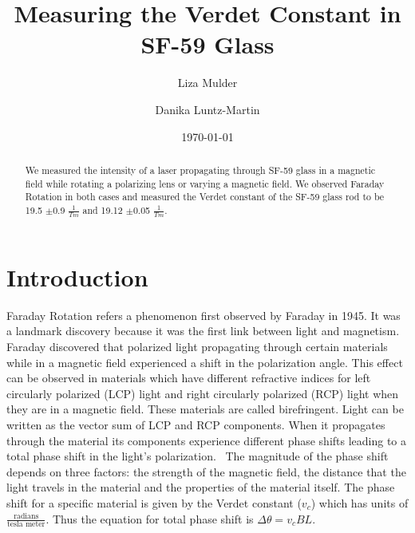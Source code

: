 \documentclass[prb,preprint]{revtex4-1}
\begin{document}

\title{Measuring the Verdet Constant in SF-59 Glass}


\author{Liza Mulder}


\author{Danika Luntz-Martin}


\date{\today}



\begin{abstract}

We measured the intensity of a laser propagating through SF-59 glass in a magnetic field while rotating a polarizing lens or varying a magnetic field.  We observed Faraday Rotation in both cases and measured the Verdet constant of the SF-59 glass rod to be 19.5 $\pm$0.9 $\frac{1}{Tm}$ and 19.12 $\pm$0.05 $\frac{1}{Tm}$.

\end{abstract}

\maketitle %


\section{Introduction} %

Faraday Rotation refers a phenomenon first observed by Faraday in 1945. It was a landmark discovery because it was the first link between light and magnetism.~\cite{teachspin} Faraday discovered that polarized light propagating through certain materials while in a magnetic field experienced a shift in the polarization angle. This effect can be observed in materials which have different refractive indices for left circularly polarized (LCP) light and right circularly polarized (RCP) light when they are in a magnetic field. These materials are called birefringent. Light can be written as the vector sum of LCP and RCP components. When it propagates through the material its components experience different phase shifts leading to a total phase shift in the light's polarization.~\cite{XXX} The magnitude of the phase shift depends on three factors: the strength of the magnetic field, the distance that the light travels in the material and the properties of the material itself. The phase shift for a specific material is given by the Verdet constant ($v_c$) which has units of $\frac{\text{radians}}{\text{tesla\ meter}}$. Thus the equation for total phase shift is $\Delta \theta = v_c B L$.
\end{document}
